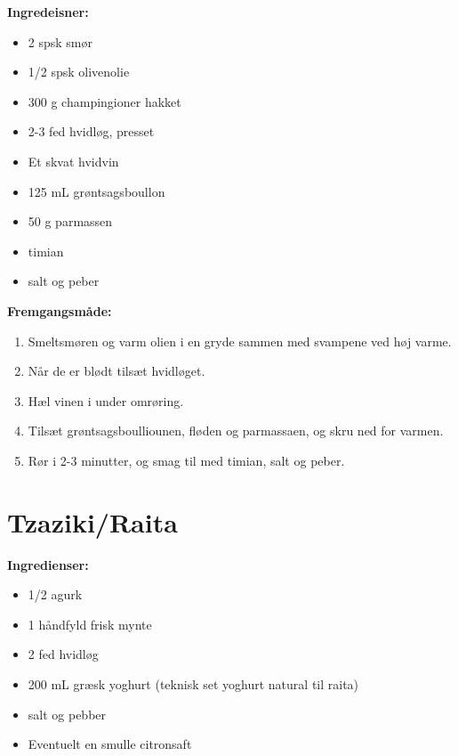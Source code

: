 \documentclass{book}
\begin{document}
\begin{minipage}[t]{0.5\textwidth}
\textbf{Ingredeisner:}
\begin{itemize}
    \item 2 spsk smør
    \item 1/2 spsk olivenolie
    \item 300 g champingioner hakket 
    \item 2-3 fed hvidløg, presset
    \item Et skvat hvidvin
    \item 125 mL grøntsagsboullon
    \item 50 g parmassen
    \item timian
    \item salt og peber
\end{itemize}
\end{minipage}
\begin{minipage}[t]{0.5\textwidth}
\textbf{Fremgangsmåde:}
\begin{enumerate}
    \item Smeltsmøren og varm olien i en gryde sammen med svampene ved høj varme.
    \item Når de er blødt tilsæt hvidløget.
    \item Hæl vinen i under omrøring.
    \item Tilsæt grøntsagsboulliounen, fløden og parmassaen, og skru ned for varmen.
    \item Rør i 2-3 minutter, og smag til med timian, salt og peber.
\end{enumerate}
\end{minipage}
\newpage {}
\newpage \section{Tzaziki/Raita}
\begin{minipage}[t]{0.5\textwidth}
\textbf{Ingredienser:}
\begin{itemize}
    \item 1/2 agurk
    \item 1 håndfyld frisk mynte
    \item 2 fed hvidløg
    \item 200 mL græsk yoghurt (teknisk set yoghurt natural til raita)
    \item salt og pebber
    \item Eventuelt en smulle citronsaft
\end{itemize}
\end{minipage}
\end{document}
